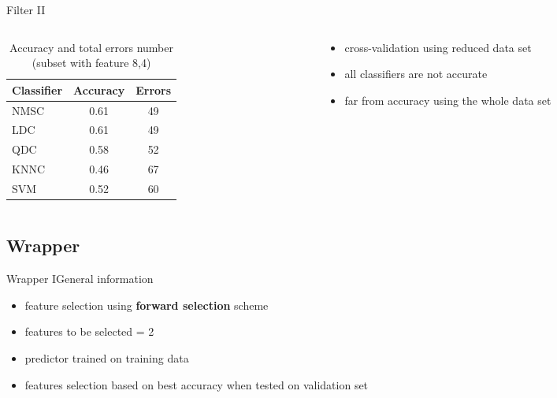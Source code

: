 \documentclass{beamer}
\begin{document}
\begin{frame}{Filter II}
\begin{columns}[t]
\begin{column}{.4\textwidth}
\begin{table}
\begin{tabular}{l || c | c  }
Classifier & Accuracy & Errors \\
\hline \hline
NMSC & 0.61 & 49  \\ 
LDC & 0.61 & 49 \\
QDC & 0.58 & 52 \\
KNNC & 0.46 & 67 \\
SVM & 0.52 & 60
\end{tabular}
\caption{{\scriptsize Accuracy and total errors number (subset with feature 8,4)}}
\end{table}

\end{column}
\begin{column}{.6\textwidth}
	\begin{itemize}
	\item{
	cross-validation using reduced data set
	}
	\item{
	all classifiers are not accurate
	}
	\item{
	far from accuracy using the whole data set
	}
	\end{itemize}
\end{column}
\end{columns}
\end{frame}

\subsection{Wrapper}

\begin{frame}{Wrapper I}{General information}
  \begin{itemize}
  \item {feature selection using \textbf{forward selection} scheme
  }
  \item {
    features to be selected = 2
   }
  \item {
    predictor trained on training data
  }
  \item {
    features selection based on best accuracy when tested on validation set
  }
  \end{itemize}
\end{frame}
\end{document}
